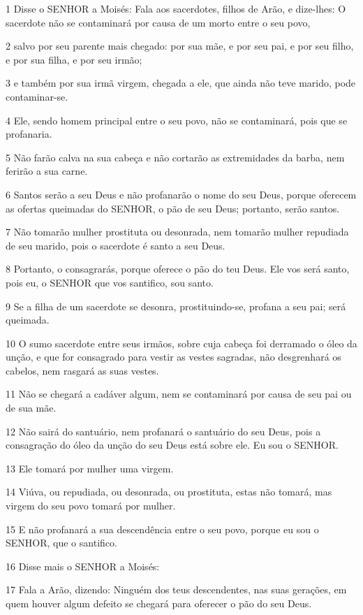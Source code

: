 \par 1 Disse o SENHOR a Moisés: Fala aos sacerdotes, filhos de Arão, e dize-lhes: O sacerdote não se contaminará por causa de um morto entre o seu povo,
\par 2 salvo por seu parente mais chegado: por sua mãe, e por seu pai, e por seu filho, e por sua filha, e por seu irmão;
\par 3 e também por sua irmã virgem, chegada a ele, que ainda não teve marido, pode contaminar-se.
\par 4 Ele, sendo homem principal entre o seu povo, não se contaminará, pois que se profanaria.
\par 5 Não farão calva na sua cabeça e não cortarão as extremidades da barba, nem ferirão a sua carne.
\par 6 Santos serão a seu Deus e não profanarão o nome do seu Deus, porque oferecem as ofertas queimadas do SENHOR, o pão de seu Deus; portanto, serão santos.
\par 7 Não tomarão mulher prostituta ou desonrada, nem tomarão mulher repudiada de seu marido, pois o sacerdote é santo a seu Deus.
\par 8 Portanto, o consagrarás, porque oferece o pão do teu Deus. Ele vos será santo, pois eu, o SENHOR que vos santifico, sou santo.
\par 9 Se a filha de um sacerdote se desonra, prostituindo-se, profana a seu pai; será queimada.
\par 10 O sumo sacerdote entre seus irmãos, sobre cuja cabeça foi derramado o óleo da unção, e que for consagrado para vestir as vestes sagradas, não desgrenhará os cabelos, nem rasgará as suas vestes.
\par 11 Não se chegará a cadáver algum, nem se contaminará por causa de seu pai ou de sua mãe.
\par 12 Não sairá do santuário, nem profanará o santuário do seu Deus, pois a consagração do óleo da unção do seu Deus está sobre ele. Eu sou o SENHOR.
\par 13 Ele tomará por mulher uma virgem.
\par 14 Viúva, ou repudiada, ou desonrada, ou prostituta, estas não tomará, mas virgem do seu povo tomará por mulher.
\par 15 E não profanará a sua descendência entre o seu povo, porque eu sou o SENHOR, que o santifico.
\par 16 Disse mais o SENHOR a Moisés:
\par 17 Fala a Arão, dizendo: Ninguém dos teus descendentes, nas suas gerações, em quem houver algum defeito se chegará para oferecer o pão do seu Deus.

